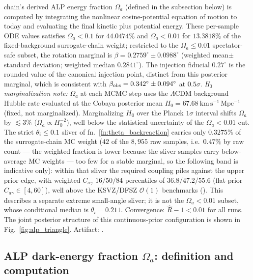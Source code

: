 \documentclass[aps,prd,twocolumn,superscriptaddress,showpacs,preprintnumbers,nofootinbib,longbibliography,floatfix]{revtex4-2}
\begin{document}
chain's derived ALP energy fraction $\Omega_a$ (defined in the subsection
below) is computed by integrating the nonlinear cosine-potential equation of
motion to today and evaluating the final kinetic plus potential energy. These
per-sample ODE values
satisfies $\Omega_a < 0.1$
for $44.0474\%$ and $\Omega_a < 0.01$ for $13.3818\%$ of the
fixed-background surrogate-chain weight;
restricted to the $\Omega_a \le 0.01$ spectator-safe subset, the rotation
marginal is $\beta = 0.2759^\circ \pm 0.0988^\circ$ (weighted
mean$\pm$standard deviation; weighted median $0.2841^\circ$). The injection
fiducial $0.27^\circ$ is the rounded value of the canonical
injection point, distinct from this posterior marginal, which is consistent with
$\beta_{\rm obs}=0.342^\circ\pm0.094^\circ$ at $0.5\sigma$.
\emph{H$_0$ marginalization note:} $\Omega_a$ at each MCMC step uses the $\Lambda$CDM background
Hubble rate evaluated at the Cobaya posterior mean $H_0 = 67.68~\mathrm{km\,s^{-1}\,Mpc^{-1}}$
(fixed, not marginalized). Marginalizing $H_0$ over the Planck $1\sigma$ interval
shifts $\Omega_a$ by $\lesssim 3\%$ ($\Omega_a \propto H_0^{-2}$), well below
the statistical uncertainty of the $\Omega_a < 0.01$ cut.
The strict $\theta_i \le 0.1$ sliver of fn.~\ref{fn:theta_backreaction} carries only
$0.3275\%$ of the surrogate-chain MC weight ($42$ of the $8{,}955$ raw
samples, i.e.\ $0.47\%$ by raw count --- the weighted fraction is lower
because the sliver samples carry below-average MC weights --- too few for
a stable marginal, so the following band is indicative only): within that sliver the required coupling piles against
the upper prior edge, with weighted $C_{a\gamma}$ $16/50/84$ percentiles
of $36.8/47.2/55.6$ (flat prior $C_{a\gamma}\in[4,60]$), well above the
KSVZ/DFSZ $\mathcal{O}(1)$ benchmarks
().
This describes a separate extreme small-angle sliver; it is not the
$\Omega_a<0.01$ subset, whose conditional median is $\theta_i=0.211$.
Convergence:
$\hat{R}-1 < 0.01$ for all runs. The joint posterior structure of this
continuous-prior configuration is shown in Fig.~\ref{fig:alp_triangle}.
Artifact: .

\subsection*{ALP dark-energy fraction $\Omega_a$: definition and computation}
\label{sec:omega_a_def}
\end{document}
